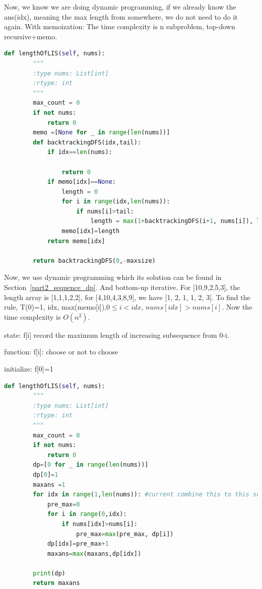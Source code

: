 \documentclass[../specific-algorithms.tex]{subfiles}
\begin{document}
Now, we know we are doing dynamic programming, if we already know the ans(idx), meaning the max length from somewhere, we do not need to do it again. With memoization: The time complexity is n subproblem, top-down recursive+memo.
\begin{lstlisting}[language = Python]
def lengthOfLIS(self, nums):
        """
        :type nums: List[int]
        :rtype: int
        """
        max_count = 0
        if not nums:
            return 0
        memo =[None for _ in range(len(nums))]
        def backtrackingDFS(idx,tail):
            if idx==len(nums):
                
                return 0
            if memo[idx]==None:
                length = 0
                for i in range(idx,len(nums)):
                    if nums[i]>tail:
                        length = max(1+backtrackingDFS(i+1, nums[i]), length)
                memo[idx]=length
            return memo[idx]
        
        return backtrackingDFS(0,-maxsize)
\end{lstlisting}

Now, we use dynamic programming which its solution can be found in Section~\ref{part2_sequence_dp}.  And bottom-up iterative. For [10,9,2,5,3], the length array is [1,1,1,2,2], for [4,10,4,3,8,9], we have [1, 2, 1, 1, 2, 3]. To find the rule, T(0)=1, idx, max(memo[i]),$0\leq i<idx$, $nums[idx]>nums[i]$. Now the time complexity is $O(n^2)$.

state: f[i] record the maximum length of increasing subsequence from 0-i.

function: f[i]: choose or not to choose

initialize: f[0]=1
\begin{lstlisting}[language = Python]
def lengthOfLIS(self, nums):
        """
        :type nums: List[int]
        :rtype: int
        """
        max_count = 0
        if not nums:
            return 0
        dp=[0 for _ in range(len(nums))]
        dp[0]=1
        maxans =1
        for idx in range(1,len(nums)): #current combine this to this subsequence, 10 to [], 9 to [10]
            pre_max=0
            for i in range(0,idx):
                if nums[idx]>nums[i]:
                    pre_max=max(pre_max, dp[i])
            dp[idx]=pre_max+1
            maxans=max(maxans,dp[idx])
            
        print(dp)
        return maxans
\end{lstlisting}
\end{document}
